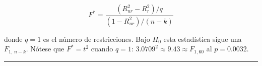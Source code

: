 \documentclass[12pt, letterpaper]{article}
\begin{document}
\begin{equation}
  F^* = \frac{(R_{ur}^2 - R_r^2)/q}{(1 - R_{ur}^2)/(n - k)}
  \label{eq:F_incremental}
\end{equation}

\noindent donde $q = 1$ es el número de restricciones. Bajo $H_0$ esta
estadística sigue una $F_{1,\, n-k}$. Nótese que $F^* = t^2$ cuando $q=1$:
$3.0709^2 \approx 9.43 \approx F_{1,60}$ al $p = 0.0032$.

\vspace{18pt}
\noindent\rule{\linewidth}{0.4pt}

\end{document}
